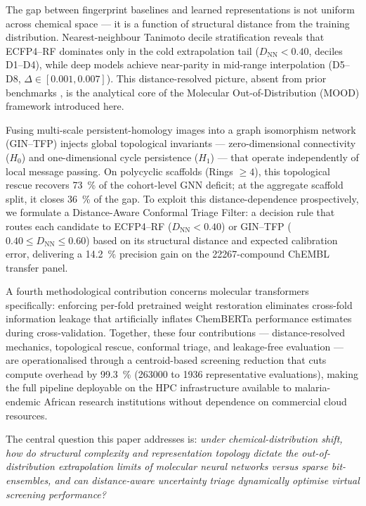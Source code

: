 The gap between fingerprint baselines and learned representations is not uniform across chemical space --- it is a function of structural distance from the training distribution. Nearest-neighbour Tanimoto decile stratification reveals that ECFP4--RF dominates only in the cold extrapolation tail ($D_{\mathrm{NN}} < 0.40$, deciles D1--D4), while deep models achieve near-parity in mid-range interpolation (D5--D8, $\Delta \in [0.001, 0.007]$). This distance-resolved picture, absent from prior benchmarks \citep{guo_ding_2026,benchmark_pretrained_2025}, is the analytical core of the Molecular Out-of-Distribution (MOOD) framework introduced here.

Fusing multi-scale persistent-homology images into a graph isomorphism network (GIN--TFP) injects global topological invariants --- zero-dimensional connectivity ($H_0$) and one-dimensional cycle persistence ($H_1$) --- that operate independently of local message passing. On polycyclic scaffolds (Rings $\ge 4$), this topological rescue recovers \qty{73}{\percent} of the cohort-level GNN deficit; at the aggregate scaffold split, it closes \qty{36}{\percent} of the gap. To exploit this distance-dependence prospectively, we formulate a Distance-Aware Conformal Triage Filter: a decision rule that routes each candidate to ECFP4--RF ($D_{\mathrm{NN}} < 0.40$) or GIN--TFP ($0.40 \le D_{\mathrm{NN}} \le 0.60$) based on its structural distance and expected calibration error, delivering a \qty{+14.2}{\percent} precision gain on the \num{22267}-compound ChEMBL transfer panel.

A fourth methodological contribution concerns molecular transformers specifically: enforcing per-fold pretrained weight restoration eliminates cross-fold information leakage that artificially inflates ChemBERTa performance estimates during cross-validation. Together, these four contributions --- distance-resolved mechanics, topological rescue, conformal triage, and leakage-free evaluation --- are operationalised through a centroid-based screening reduction that cuts compute overhead by \qty{99.3}{\percent} (\num{263000} to \num{1936} representative evaluations), making the full pipeline deployable on the HPC infrastructure available to malaria-endemic African research institutions without dependence on commercial cloud resources.

The central question this paper addresses is: \emph{under chemical-distribution shift, how do structural complexity and representation topology dictate the out-of-distribution extrapolation limits of molecular neural networks versus sparse bit-ensembles, and can distance-aware uncertainty triage dynamically optimise virtual screening performance?}

